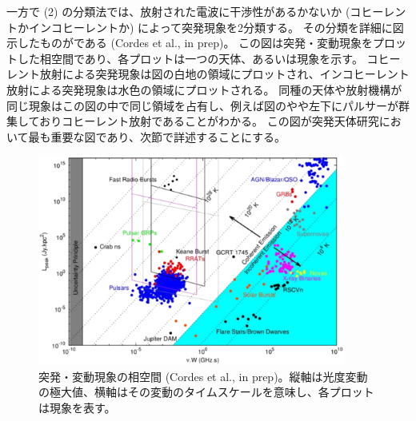 一方で (2) の分類法では、放射された電波に干渉性があるかないか (コヒーレントかインコヒーレントか) によって突発現象を2分類する。
その分類を詳細に図示したものがである (Cordes et al., in prep)。
この図は突発・変動現象をプロットした相空間であり、各プロットは一つの天体、あるいは現象を示す。
コヒーレント放射による突発現象は図の白地の領域にプロットされ、インコヒーレント放射による突発現象は水色の領域にプロットされる。
同種の天体や放射機構が同じ現象はこの図の中で同じ領域を占有し、例えば図のやや左下にパルサーが群集しておりコヒーレント放射であることがわかる。
この図が突発天体研究において最も重要な図であり、次節で詳述することにする。
\begin{figure}
	\centering
	\includegraphics[width=0.9\textwidth]{transients/transients.phasespace.eps}
	\caption{突発・変動現象の相空間 (Cordes et al., in prep)。縦軸は光度変動の極大値、横軸はその変動のタイムスケールを意味し、各プロットは現象を表す。}
	\label{fig:transients.phasespace}
\end{figure}%

